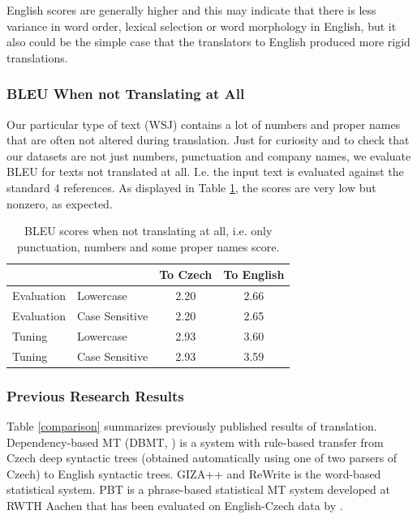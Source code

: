 \documentclass[11pt]{report}
\theoremstyle{plain}
\begin{document}
{{English scores are generally higher and this may indicate that there is less variance
in word order, lexical selection or word morphology in English, but it also
could be the simple case that the translators to English produced more rigid
translations.


\subsubsection{BLEU When not Translating at All}

Our particular type of text (WSJ) contains a lot of numbers and proper names
that are often not altered during translation. Just for curiosity and to 
check that our datasets are not just numbers, punctuation and company names, we
evaluate BLEU for texts not translated at all. I.e. the input text is evaluated
against the standard 4 references. As displayed in Table
\ref{nontransl}, the scores are very low but nonzero, as expected.

\begin{table}[ht]
\begin{center}
\begin{tabular}{llcc}
   &     &  To Czech   &  To English\\
\hline
Evaluation   &  Lowercase   &  2.20  &  2.66\\
Evaluation   &  Case Sensitive   &  2.20  &  2.65\\
Tuning   &  Lowercase   &  2.93  &  3.60\\
Tuning   &  Case Sensitive   &  2.93  &  3.59\\
\end{tabular}
\end{center}
\caption{BLEU scores when not translating at all, i.e. only punctuation, numbers
and some proper names score.}
\label{nontransl}
\end{table}


\subsubsection{Previous Research Results}

Table \ref{comparison} summarizes previously published results of \toen{}
translation. Dependency-based MT (DBMT, )
is a system with rule-based transfer from Czech deep syntactic trees (obtained
automatically using one of two parsers of Czech) to English
syntactic trees. GIZA++  and ReWrite
 is the  word-based statistical system.
PBT  is a phrase-based statistical
MT system developed at RWTH Aachen that has been evaluated on English-Czech data
by .


}}
\end{document}
